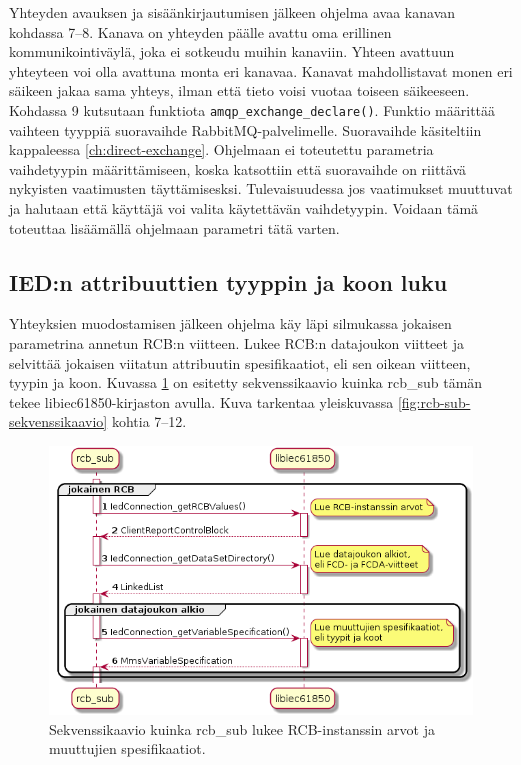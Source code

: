 Yhteyden avauksen ja sisäänkirjautumisen jälkeen ohjelma avaa kanavan kohdassa 7--8. Kanava on yhteyden päälle avattu oma erillinen kommunikointiväylä, joka ei sotkeudu muihin kanaviin. Yhteen avattuun yhteyteen voi olla avattuna monta eri kanavaa. Kanavat mahdollistavat monen eri säikeen jakaa sama yhteys, ilman että tieto voisi vuotaa toiseen säikeeseen. Kohdassa 9 kutsutaan funktiota \texttt{amqp\_exchange\_declare()}. Funktio määrittää vaihteen tyyppiä suoravaihde RabbitMQ-palvelimelle. Suoravaihde käsiteltiin kappaleessa \ref{ch:direct-exchange}. Ohjelmaan ei toteutettu parametria vaihdetyypin määrittämiseen, koska katsottiin että suoravaihde on riittävä nykyisten vaatimusten täyttämisesksi. Tulevaisuudessa jos vaatimukset muuttuvat ja halutaan että käyttäjä voi valita käytettävän vaihdetyypin. Voidaan tämä toteuttaa lisäämällä ohjelmaan parametri tätä varten.


\subsection{IED:n attribuuttien tyyppin ja koon luku}
Yhteyksien muodostamisen jälkeen ohjelma käy läpi silmukassa jokaisen parametrina annetun RCB:n viitteen. Lukee RCB:n datajoukon viitteet ja selvittää jokaisen viitatun attribuutin spesifikaatiot, eli sen oikean viitteen, tyypin ja koon. Kuvassa \ref{fig:rcb-sub-reading-specifications} on esitetty sekvenssikaavio kuinka rcb\_sub tämän tekee libiec61850-kirjaston avulla. Kuva tarkentaa yleiskuvassa \ref{fig:rcb-sub-sekvenssikaavio} kohtia 7--12.

\begin{figure}[ht!]
	\includegraphics[width=1\textwidth]{pictures/rcb-sub-reading-specifications.png}
	\caption{Sekvenssikaavio kuinka rcb\_sub lukee RCB-instanssin arvot ja muuttujien spesifikaatiot.}
	\label{fig:rcb-sub-reading-specifications}
\end{figure}


